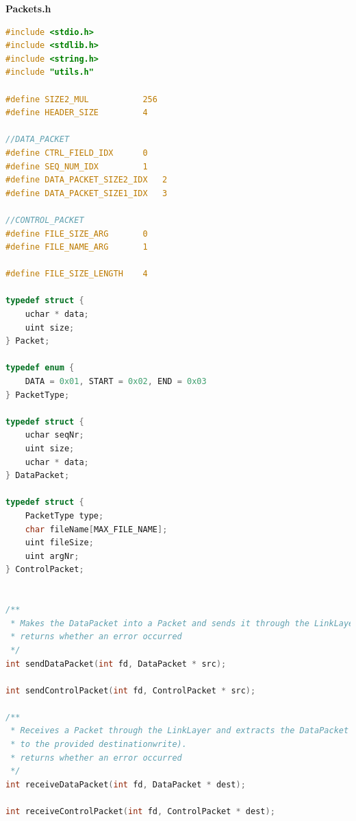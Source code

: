 \documentclass[a4paper, 11pt]{article}
\begin{document}
\huge\textbf{Packets.h}
\begin{lstlisting}[language=C]
#include <stdio.h>
#include <stdlib.h>
#include <string.h>
#include "utils.h"

#define SIZE2_MUL           256
#define HEADER_SIZE         4

//DATA_PACKET
#define CTRL_FIELD_IDX      0
#define SEQ_NUM_IDX         1
#define DATA_PACKET_SIZE2_IDX   2
#define DATA_PACKET_SIZE1_IDX   3

//CONTROL_PACKET
#define FILE_SIZE_ARG       0
#define FILE_NAME_ARG       1

#define FILE_SIZE_LENGTH    4

typedef struct {
    uchar * data;
    uint size;
} Packet;

typedef enum {
    DATA = 0x01, START = 0x02, END = 0x03
} PacketType;

typedef struct {
    uchar seqNr;
    uint size;
    uchar * data;
} DataPacket;

typedef struct {
    PacketType type;
    char fileName[MAX_FILE_NAME];
    uint fileSize;
    uint argNr;
} ControlPacket;


/**
 * Makes the DataPacket into a Packet and sends it through the LinkLayer (llwrite)
 * returns whether an error occurred
 */
int sendDataPacket(int fd, DataPacket * src);

int sendControlPacket(int fd, ControlPacket * src);

/**
 * Receives a Packet through the LinkLayer and extracts the DataPacket
 * to the provided destinationwrite).
 * returns whether an error occurred
 */
int receiveDataPacket(int fd, DataPacket * dest);

int receiveControlPacket(int fd, ControlPacket * dest);
\end{lstlisting}
\newpage
\end{document}
